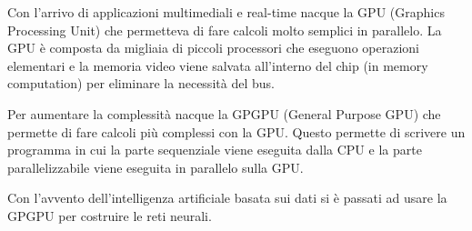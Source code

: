 \documentclass[a4paper]{article}
\theoremstyle{break}
\theoremstyle{break}
\theoremstyle{break}
\theoremstyle{break}
\begin{document}
\begin{itemize}
\begin{figure}[H]
    \end{figure}

    \vspace{1em}
    \noindent Con l'arrivo di applicazioni multimediali e real-time nacque la
    GPU (Graphics Processing Unit) che permetteva di fare calcoli molto semplici
    in parallelo. La GPU è composta da migliaia di piccoli processori che eseguono
    operazioni elementari e la memoria video viene salvata all'interno del chip
    (in memory computation) per eliminare la necessità del bus.

    \vspace{1em}
    \noindent Per aumentare la complessità nacque la GPGPU (General Purpose GPU)
    che permette di fare calcoli più complessi con la GPU. Questo permette di
    scrivere un programma in cui la parte sequenziale viene eseguita dalla CPU
    e la parte parallelizzabile viene eseguita in parallelo sulla GPU.

    \vspace{1em}
    \noindent Con l'avvento dell'intelligenza artificiale basata sui dati si
    è passati ad usare la GPGPU per costruire le reti neurali.
\end{itemize}
\end{document}
